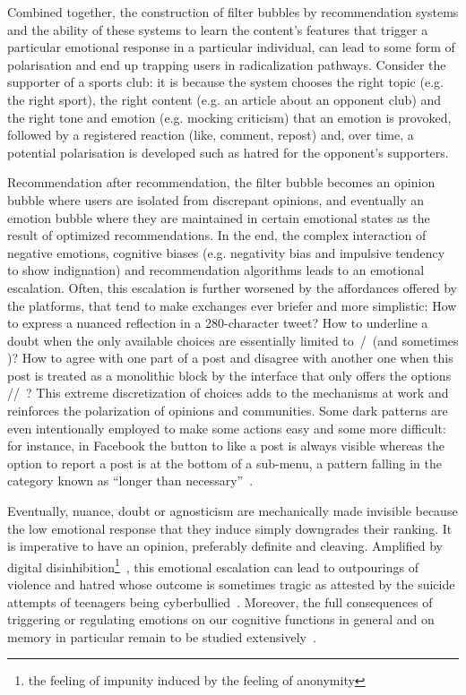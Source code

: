 \documentclass[10pt]{article}
\begin{document}
Combined together, the construction of filter bubbles by recommendation systems and the ability of these systems to learn the content's features that trigger a particular emotional response in a particular individual, can lead to some form of polarisation and end up trapping users in radicalization pathways.
Consider the supporter of a sports club: it is because the system chooses the right topic (e.g. the right sport), the right content (e.g. an article about an opponent club) and the right tone and emotion (e.g. mocking criticism) that an emotion is provoked, followed by a registered reaction (like, comment, repost) and, over time, a potential polarisation is developed such as hatred for the opponent's supporters.

Recommendation after recommendation, the filter bubble becomes an opinion bubble where users are isolated from discrepant opinions, and eventually an emotion bubble where they are maintained in certain emotional states as the result of optimized recommendations.
In the end, the complex interaction of negative emotions, cognitive biases (e.g. negativity bias and impulsive tendency to show indignation) and recommendation algorithms leads to an emotional escalation.
Often, this escalation is further worsened by the affordances offered by the platforms, that tend to make exchanges ever briefer and more simplistic: 
How to express a nuanced reflection in a 280-character tweet? How to underline a doubt when the only available choices are essentially limited to~\faHeartO/\faThumbsOUp~(and sometimes \faThumbsODown)? 
How to agree with one part of a post and disagree with another one when this post is treated as a monolithic block by the interface that only offers the options \faRetweet/\faShare/\faShareAlt~?
This extreme discretization of choices adds to the mechanisms at work and reinforces the polarization of opinions and communities.
Some dark patterns are even intentionally employed to make some actions easy and some more difficult: for instance, in Facebook the button to like a post is always visible whereas the option to report a post is at the bottom of a sub-menu, a pattern falling in the category known as ``longer than necessary''~\cite{edpb_guidelines_2022}.

Eventually, nuance, doubt or agnosticism are mechanically made invisible because the low emotional response that they induce simply downgrades their ranking. It is imperative to have an opinion, preferably definite and cleaving.
Amplified by digital disinhibition\footnote{the feeling of impunity induced by the feeling of anonymity}~\cite{suler_online_2004}, this emotional escalation can lead to outpourings of violence and hatred whose outcome is sometimes tragic as attested by the suicide attempts of teenagers being cyberbullied~\cite{schonfeld_cyberbullying_2023}.
Moreover, the full consequences of triggering or regulating emotions on our cognitive functions in general and on memory in particular remain to be studied extensively~\cite{richards2000emotion}.
\end{document}
